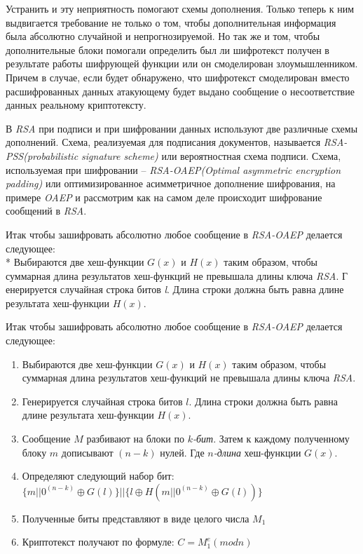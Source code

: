   Устранить и эту неприятность помогают схемы дополнения. Только теперь к ним выдвигается требование не только о том, чтобы дополнительная информация была 
  абсолютно случайной и непрогнозируемой. Но так же и том, чтобы дополнительные блоки помогали определить был ли шифротекст получен в результате работы 
  шифрующей функции или он смоделирован злоумышленником. Причем в случае, если будет обнаружено, что шифротекст смоделирован вместо расшифрованных данных 
  атакующему будет выдано сообщение о несоответствие данных реальному криптотексту.

  В \textit{RSA} при подписи и при шифровании данных используют две различные схемы дополнений. Схема, реализуемая для подписания документов, называется 
  \textit{RSA-PSS(probabilistic signature scheme)} или вероятностная схема подписи. Схема, используемая при шифровании – 
  \textit{RSA-OAEP(Optimal asymmetric encryption padding)} или оптимизированное асимметричное дополнение шифрования, на примере \textit{OAEP} и рассмотрим 
  как на самом деле происходит шифрование сообщений в \textit{RSA}.

  Итак чтобы зашифровать абсолютно любое сообщение в \textit{RSA-OAEP} делается следующее: \\*
  Выбираются две хеш-функции {$G(x)$} и {$H(x)$} таким образом, чтобы суммарная длина результатов хеш-функций не превышала длины ключа \textit{RSA}. Г
  енерируется случайная строка битов \textit{l}. Длина строки должна быть равна длине результата хеш-функции {$H(x)$}.

  Итак чтобы зашифровать абсолютно любое сообщение в \textit{RSA-OAEP} делается следующее:
    \begin{enumerate}
	    \item Выбираются две хеш-функции {$G(x)$} и {$H(x)$} таким образом, чтобы суммарная длина результатов хеш-функций не превышала длины 
	      ключа \textit{RSA}.
	    \item Генерируется случайная строка битов {$l$}. Длина строки должна быть равна длине результата хеш-функции {$H(x)$}.
	    \item Сообщение {$M$} разбивают на блоки по \textit{{$k$}-бит}. Затем к каждому полученному блоку {$m$} дописывают {$(n-k)$} нулей. 
	      Где \textit{{$n$}-длина} хеш-функции {$G(x)$}.
	    \item Определяют следующий набор бит: {$ \{m||0^{(n-k)} \oplus G(l)\}||\{l \oplus H(m||0^{(n-k)} \oplus G(l))\} $}
	    \item Полученные биты представляют в виде целого числа {$M_1$}
	    \item Криптотекст получают по формуле: {$ C=M_{1}^{e}(mod n) $}
    \end{enumerate}

